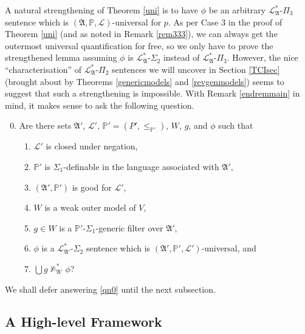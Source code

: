 \documentclass[12pt]{article}
\numberwithin{equation}{section}
\begin{document}
A natural strengthening of Theorem \ref{uni} is to have $\phi$ be an arbitrary $\mathcal{L}^{*}_{\mathfrak{A}}$-$\Pi_3$ sentence which is $(\mathfrak{A}, \mathbb{P}, \mathcal{L})$-universal for $p$. As per Case 3 in the proof of Theorem \ref{uni} (and as noted in Remark \ref{rem333}), we can always get the outermost universal quantification for free, so we only have to prove the strengthened lemma assuming $\phi$ is $\mathcal{L}^{*}_{\mathfrak{A}}$-$\Sigma_2$ instead of $\mathcal{L}^{*}_{\mathfrak{A}}$-$\Pi_3$. However, the nice ``characterisation'' of $\mathcal{L}^{*}_{\mathfrak{A}}$-$\Pi_2$ sentences we will uncover in Section \ref{TCIsec} (brought about by Theorems \ref{genericmodels} and \ref{revgenmodels}) seems to suggest that such a strengthening is impossible. With Remark \ref{endremmain} in mind, it makes sense to ask the following question.

\begin{enumerate}[label=(Q\arabic*)]
    \setcounter{enumi}{-1}
    \item\label{qn0} Are there sets $\mathfrak{A}'$, $\mathcal{L}'$, $\mathbb{P}' = (P', \leq_{\mathbb{P}'})$, $W$, $g$, and $\phi$ such that
    \begin{enumerate}[label=(\alph*)]
        \item $\mathcal{L}'$ is closed under negation,
        \item $\mathbb{P}'$ is $\Sigma_1$-definable in the language associated with $\mathfrak{A}'$,
        \item $(\mathfrak{A}', \mathbb{P}')$ is good for $\mathcal{L}'$,
        \item $W$ is a weak outer model of $V$,
        \item $g \in W$ is a $\mathbb{P}'$-$\Sigma_1$-generic filter over $\mathfrak{A}'$,
        \item $\phi$ is a $\mathcal{L}^{*}_{\mathfrak{A}'}$-$\Sigma_2$ sentence which is $(\mathfrak{A}', \mathbb{P}', \mathcal{L}')$-universal, and
        \item $\bigcup g \not \models^{*}_{\mathfrak{A}'} \phi$?
    \end{enumerate}
\end{enumerate}

We shall defer answering \ref{qn0} until the next subsection. 

\subsection{A High-level Framework}\label{forframe}
\end{document}
